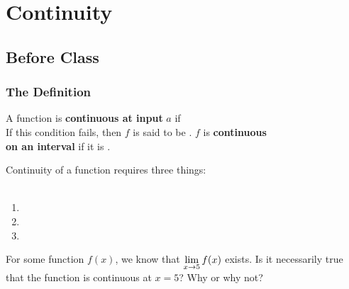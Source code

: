 \documentclass[notes]{subfiles}
\begin{document}
	\fancyhead[LO,RE]{\bfseries \small \currentname}
	\fancyfoot[C]{{}}
	\fancyfoot[LO,RE]{\large \thepage}	%
	
\section*{Continuity}\label{cs24}
	\subsection*{Before Class}
	\subsubsection*{The Definition}
		\begin{defn}[Continuity]
			A function is \textbf{continuous at input} \(a\) if \\[50pt]

			 If this condition fails, then \(f\) is said to be . \(f\) is \textbf{continuous} \\[20pt] \textbf{on an interval} if it is .
		\end{defn}
			
		\begin{rmk}
			Continuity of a function requires three things:\\ \\
				\begin{enumerate}
				\setlength\itemsep{15pt}
					\item {} 
					\item {}
					\item {}
				\end{enumerate}

		\end{rmk}
		
		\begin{ex}
			For some function \(f(x)\), we know that \(\displaystyle \lim_{x\to 5} f(x)\) exists. Is it necessarily true that the function is continuous at \(x=5\)? Why or why not?
		\end{ex}
			\newpage
			
\end{document}
